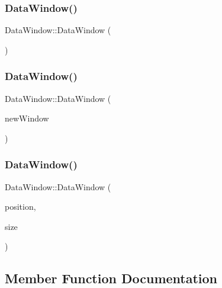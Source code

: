\subsubsection{\texorpdfstring{Data\+Window()}{DataWindow()}\hspace{0.1cm}{\footnotesize\ttfamily [1/3]}}
{\footnotesize\ttfamily Data\+Window\+::\+Data\+Window (\begin{DoxyParamCaption}{ }\end{DoxyParamCaption})}

\mbox{\label{class_data_window_ae8d140b0dc0599d733e3d5a1f704579c}} 
\subsubsection{\texorpdfstring{Data\+Window()}{DataWindow()}\hspace{0.1cm}{\footnotesize\ttfamily [2/3]}}
{\footnotesize\ttfamily Data\+Window\+::\+Data\+Window (\begin{DoxyParamCaption}\item[{const \mbox{\hyperlink{class_data_window}{Data\+Window}} \&}]{new\+Window }\end{DoxyParamCaption})}

\mbox{\label{class_data_window_a8e8d9430e25c484396f7a66f080c029b}} 
\subsubsection{\texorpdfstring{Data\+Window()}{DataWindow()}\hspace{0.1cm}{\footnotesize\ttfamily [3/3]}}
{\footnotesize\ttfamily Data\+Window\+::\+Data\+Window (\begin{DoxyParamCaption}\item[{sf\+::\+Vector2f}]{position,  }\item[{sf\+::\+Vector2f}]{size }\end{DoxyParamCaption})}



\subsection{Member Function Documentation}
\mbox{\label{class_data_window_a0e57ffff01c3dad8282f9768a3c9e949}} 
